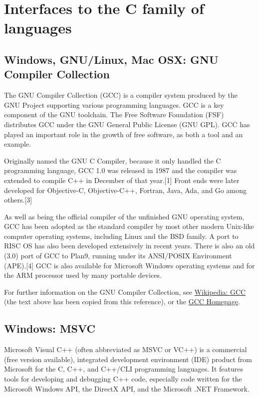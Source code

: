 


\chapter{Interfaces to the C family of languages}

\section{Windows, GNU/Linux, Mac OSX: GNU Compiler Collection}
The GNU Compiler Collection (GCC) is a compiler system produced by the GNU Project supporting various programming languages. GCC is a key component of the GNU toolchain. The Free Software Foundation (FSF) distributes GCC under the GNU General Public License (GNU GPL). GCC has played an important role in the growth of free software, as both a tool and an example.

\vpara
Originally named the GNU C Compiler, because it only handled the C programming language, GCC 1.0 was released in 1987 and the compiler was extended to compile C++ in December of that year.[1] Front ends were later developed for Objective-C, Objective-C++, Fortran, Java, Ada, and Go among others.[3]

\vpara
As well as being the official compiler of the unfinished GNU operating system, GCC has been adopted as the standard compiler by most other modern Unix-like computer operating systems, including Linux and the BSD family. A port to RISC OS has also been developed extensively in recent years. There is also an old (3.0) port of GCC to Plan9, running under its ANSI/POSIX Environment (APE).[4] GCC is also available for Microsoft Windows operating systems and for the ARM processor used by many portable devices.

\vpara
For further information on the GNU Compiler Collection, see \href{http://en.wikipedia.org/wiki/GNU_Compiler_Collection}{Wikipedia: GCC} (the text above has been copied from this reference), or the  \href{http://gcc.gnu.org/}{GCC Homepage}.


\section{Windows: MSVC}
Microsoft Visual C++ (often abbreviated as MSVC or VC++) is a commercial (free version available), integrated development environment (IDE) product from Microsoft for the C, C++, and C++/CLI programming languages. It features tools for developing and debugging C++ code, especially code written for the Microsoft Windows API, the DirectX API, and the Microsoft .NET Framework.

